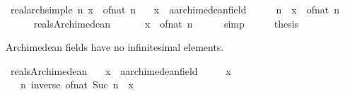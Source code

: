 \begin{isabellebody}
\isanewline
{}\isamarkupfalse%
%
\endisatagproof
{\isafoldproof}%
%
\isadelimproof
\isanewline
%
\endisadelimproof
\isanewline
{}\isamarkupfalse%
\ real{\isacharunderscore}{\kern0pt}arch{\isacharunderscore}{\kern0pt}simple{\isacharcolon}{\kern0pt}\ {\isachardoublequoteopen}{\isasymexists}n{\isachardot}{\kern0pt}\ x\ {\isasymle}\ of{\isacharunderscore}{\kern0pt}nat\ n{\isachardoublequoteclose}\isanewline
\ \ \ x\ {\isacharcolon}{\kern0pt}{\isacharcolon}{\kern0pt}\ {\isachardoublequoteopen}{\isacharprime}{\kern0pt}a{\isacharcolon}{\kern0pt}{\isacharcolon}{\kern0pt}archimedean{\isacharunderscore}{\kern0pt}field{\isachardoublequoteclose}\isanewline
%
\isadelimproof
%
\endisadelimproof
%
\isatagproof
{}\isamarkupfalse%
\ {\isacharminus}{\kern0pt}\isanewline
\ \ \isamarkupfalse%
\ n\ \ {\isachardoublequoteopen}x\ {\isacharless}{\kern0pt}\ of{\isacharunderscore}{\kern0pt}nat\ n{\isachardoublequoteclose}\isanewline
\ \ \ \ \isamarkupfalse%
\ reals{\isacharunderscore}{\kern0pt}Archimedean{}\ \isacommand{{\isachardot}{\kern0pt}{\isachardot}{\kern0pt}}\isamarkupfalse%
\isanewline
\ \ \isamarkupfalse%
\ \isamarkupfalse%
\ {\isachardoublequoteopen}x\ {\isasymle}\ of{\isacharunderscore}{\kern0pt}nat\ n{\isachardoublequoteclose}\isanewline
\ \ \ \ \isamarkupfalse%
\ simp\isanewline
\ \ \isamarkupfalse%
\ \isamarkupfalse%
\ {\isacharquery}{\kern0pt}thesis\ \isacommand{{\isachardot}{\kern0pt}{\isachardot}{\kern0pt}}\isamarkupfalse%
\isanewline
{}\isamarkupfalse%
%
\endisatagproof
{\isafoldproof}%
%
\isadelimproof
%
\endisadelimproof
%
\begin{isamarkuptext}%
Archimedean fields have no infinitesimal elements.%
\end{isamarkuptext}\isamarkuptrue%
\isamarkupfalse%
\ reals{\isacharunderscore}{\kern0pt}Archimedean{\isacharcolon}{\kern0pt}\isanewline
\ \ \ x\ {\isacharcolon}{\kern0pt}{\isacharcolon}{\kern0pt}\ {\isachardoublequoteopen}{\isacharprime}{\kern0pt}a{\isacharcolon}{\kern0pt}{\isacharcolon}{\kern0pt}archimedean{\isacharunderscore}{\kern0pt}field{\isachardoublequoteclose}\isanewline
\ \ \ {\isachardoublequoteopen}{}\ {\isacharless}{\kern0pt}\ x{\isachardoublequoteclose}\isanewline
\ \ \ {\isachardoublequoteopen}{\isasymexists}n{\isachardot}{\kern0pt}\ inverse\ {\isacharparenleft}{\kern0pt}of{\isacharunderscore}{\kern0pt}nat\ {\isacharparenleft}{\kern0pt}Suc\ n{\isacharparenright}{\kern0pt}{\isacharparenright}{\kern0pt}\ {\isacharless}{\kern0pt}\ x{\isachardoublequoteclose}\isanewline

\end{isabellebody}
